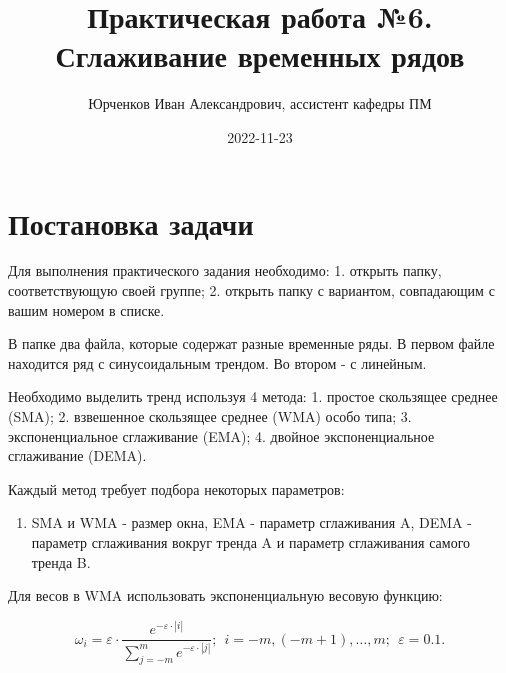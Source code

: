 \documentclass[
]{article}
\title{Практическая работа №6. Сглаживание временных рядов}
\author{Юрченков Иван Александрович, ассистент кафедры ПМ}
\date{2022-11-23}
\providecommand{\tightlist}{%
  \setlength{\itemsep}{0pt}\setlength{\parskip}{0pt}}
\begin{document}
\maketitle

\hypertarget{ux43fux43eux441ux442ux430ux43dux43eux432ux43aux430-ux437ux430ux434ux430ux447ux438}{%
\section{\texorpdfstring{\textbf{Постановка
задачи}}{Постановка задачи}}\label{ux43fux43eux441ux442ux430ux43dux43eux432ux43aux430-ux437ux430ux434ux430ux447ux438}}

Для выполнения практического задания необходимо: 1. открыть папку,
соответствующую своей группе; 2. открыть папку с вариантом, совпадающим
с вашим номером в списке.

В папке два файла, которые содержат разные временные ряды. В первом
файле находится ряд с синусоидальным трендом. Во втором - с линейным.

Необходимо выделить тренд используя 4 метода: 1. простое скользящее
среднее (SMA); 2. взвешенное скользящее среднее (WMA) особо типа; 3.
экспоненциальное сглаживание (EMA); 4. двойное экспоненциальное
сглаживание (DEMA).

Каждый метод требует подбора некоторых параметров:

\begin{enumerate}
\def\labelenumi{\arabic{enumi}.}
\tightlist
\item
  SMA и WMA - размер окна, EMA - параметр сглаживания A, DEMA - параметр
  сглаживания вокруг тренда A и параметр сглаживания самого тренда B.
\end{enumerate}

Для весов в WMA использовать экспоненциальную весовую функцию:

\[
\omega_i = \varepsilon \cdot  \frac{e ^{-\varepsilon \cdot |i|}}{\sum\limits_{j=-m}^{m} e ^{-\varepsilon \cdot |j|}};\ \ i = -m, (-m+1), \dots, m;\ \ \varepsilon = 0.1.
\]
\end{document}
